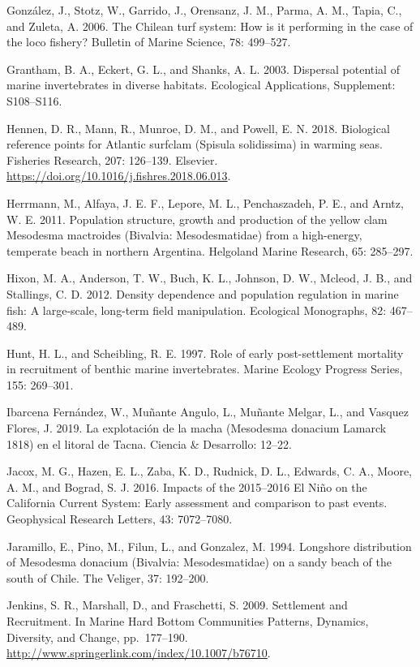 \documentclass[12pt]{article}
\begin{document}
González, J., Stotz, W., Garrido, J., Orensanz, J. M., Parma, A. M.,
Tapia, C., and Zuleta, A. 2006. The Chilean turf system: How is it
performing in the case of the loco fishery? Bulletin of Marine Science,
78: 499--527.

Grantham, B. A., Eckert, G. L., and Shanks, A. L. 2003. Dispersal
potential of marine invertebrates in diverse habitats. Ecological
Applications, Supplement: S108--S116.

Hennen, D. R., Mann, R., Munroe, D. M., and Powell, E. N. 2018.
Biological reference points for Atlantic surfclam (Spisula solidissima)
in warming seas. Fisheries Research, 207: 126--139. Elsevier.
\url{https://doi.org/10.1016/j.fishres.2018.06.013}.

Herrmann, M., Alfaya, J. E. F., Lepore, M. L., Penchaszadeh, P. E., and
Arntz, W. E. 2011. Population structure, growth and production of the
yellow clam Mesodesma mactroides (Bivalvia: Mesodesmatidae) from a
high-energy, temperate beach in northern Argentina. Helgoland Marine
Research, 65: 285--297.

Hixon, M. A., Anderson, T. W., Buch, K. L., Johnson, D. W., Mcleod, J.
B., and Stallings, C. D. 2012. Density dependence and population
regulation in marine fish: A large-scale, long-term field manipulation.
Ecological Monographs, 82: 467--489.

Hunt, H. L., and Scheibling, R. E. 1997. Role of early post-settlement
mortality in recruitment of benthic marine invertebrates. Marine Ecology
Progress Series, 155: 269--301.

Ibarcena Fernández, W., Muñante Angulo, L., Muñante Melgar, L., and
Vasquez Flores, J. 2019. La explotación de la macha (Mesodesma donacium
Lamarck 1818) en el litoral de Tacna. Ciencia \& Desarrollo: 12--22.

Jacox, M. G., Hazen, E. L., Zaba, K. D., Rudnick, D. L., Edwards, C. A.,
Moore, A. M., and Bograd, S. J. 2016. Impacts of the 2015--2016 El Niño
on the California Current System: Early assessment and comparison to
past events. Geophysical Research Letters, 43: 7072--7080.

Jaramillo, E., Pino, M., Filun, L., and Gonzalez, M. 1994. Longshore
distribution of Mesodesma donacium (Bivalvia: Mesodesmatidae) on a sandy
beach of the south of Chile. The Veliger, 37: 192--200.

Jenkins, S. R., Marshall, D., and Fraschetti, S. 2009. Settlement and
Recruitment. In Marine Hard Bottom Communities Patterns, Dynamics,
Diversity, and Change, pp.~177--190.
\url{http://www.springerlink.com/index/10.1007/b76710}.
\end{document}
